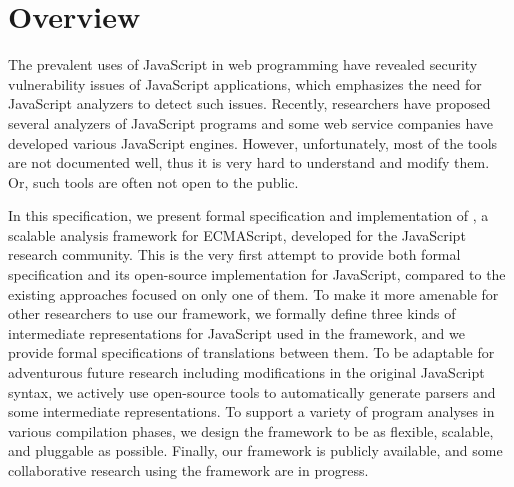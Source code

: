 \chapter{Overview}

The prevalent uses of JavaScript in web programming have revealed
security vulnerability issues of JavaScript applications,
which emphasizes the need for JavaScript analyzers to detect such issues.
Recently, researchers have proposed several analyzers of JavaScript programs
and some web service companies have developed various JavaScript engines.
However, unfortunately, most of the tools are not documented well,
thus it is very hard to understand and modify them.
Or, such tools are often not open to the public.


In this specification, we present formal specification and implementation
of \safe, a scalable analysis framework for ECMAScript, developed for the JavaScript research community.
This is the very first attempt to provide both formal specification and
its open-source implementation for JavaScript,
compared to the existing approaches focused on only one of them.
To make it more amenable for other researchers to use our framework,
we formally define three kinds of intermediate representations for JavaScript
used in the framework,
and we provide formal specifications of translations between them.
To be adaptable for adventurous future research including modifications
in the original JavaScript syntax,
we actively use open-source tools to automatically generate parsers and some intermediate
representations.
To support a variety of program analyses in various compilation phases,
we design the framework to be as flexible, scalable, and pluggable as possible.
Finally, our framework is publicly available,
and some collaborative research using the framework are in progress.
